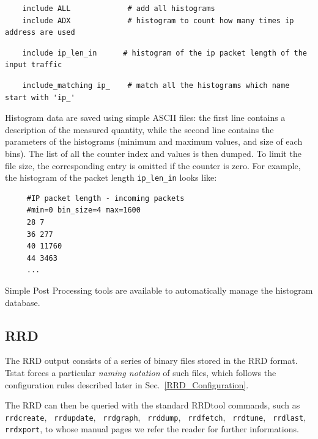 \documentclass[11pt]{article}
\begin{document}
\begin{small}\begin{verbatim}
    include ALL             # add all histograms
    include ADX             # histogram to count how many times ip address are used
\end{verbatim}\end{small} \noindent
\begin{small}\begin{verbatim}
    include ip_len_in      # histogram of the ip packet length of the input traffic
\end{verbatim}\end{small} \noindent
\begin{small}\begin{verbatim}
    include_matching ip_    # match all the histograms which name start with 'ip_'
\end{verbatim}\end{small} \noindent
Histogram data are saved using simple ASCII files: 
the first line contains a description of the
measured quantity, while the second line contains the parameters of the histograms
(minimum and maximum values, and size of each bins). The list of all
the counter index and values is then dumped. To limit the file size, the
corresponding entry is omitted if the counter is zero.
For example, the histogram of the packet length \texttt{ip\_len\_in} looks like:

\begin{small}\begin{verbatim}
     #IP packet length - incoming packets
     #min=0 bin_size=4 max=1600
     28 7
     36 277
     40 11760
     44 3463
     ...
\end{verbatim}\end{small} \noindent
Simple \textsf{Post Processing} tools are available to automatically manage the histogram
database.

\subsection{RRD\label{RRD}}


The RRD output consists of a series of binary files stored in the RRD format.
Tstat forces a particular \textit{naming notation} of such files, which follows
the configuration rules described later in Sec.~\ref{RRD_Configuration}.



The RRD can then be queried with the standard RRDtool commands, such as
\texttt{rrdcreate}, \texttt{ rrdupdate},  \texttt{ rrdgraph}, \texttt{ rrddump}, \texttt{ rrdfetch}, 
\texttt{ rrdtune}, \texttt{ rrdlast}, \texttt{ rrdxport}, to whose manual pages we refer 
the reader for further informations.
\end{document}
